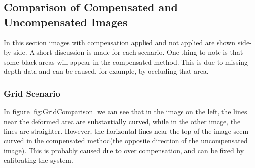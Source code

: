 \documentclass[]{article}
\begin{document}
\clearpage
\subsection{Comparison of Compensated and Uncompensated Images}
\label{sec:comparison}
In this section images with compensation applied and not applied are shown side-by-side. A short discussion is made for each scenario. One thing to note is that some black areas will appear in the compensated method. This is due to missing depth data and can be caused, for example, by occluding that area.

\subsubsection{Grid Scenario}

In figure \ref{fig:GridComparison} we can see that in the image on the left, the lines near the deformed area are substantially curved, while in the other image, the lines are straighter. However, the horizontal lines near the top of the image seem curved in the compensated method(the opposite direction of the uncompensated image). This is probably caused due to over compensation, and can be fixed by calibrating the system.
\end{document}

